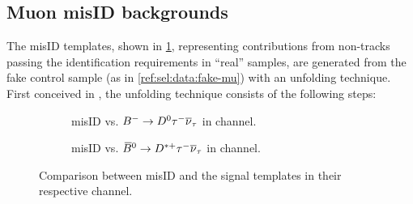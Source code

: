 \subsection{Muon misID backgrounds}
\label{ref:fit:tmpl:misid}

The \muon misID templates,
shown in \cref{fig:misid-vs-sig},
representing contributions from non-\muon tracks passing the \muon
identification requirements in ``real'' \muon samples,
are generated from the fake \muon control sample
(as in \cref{ref:sel:data:fake-mu}) with an unfolding technique.
First conceived in \cite{LHCb-ANA-2016-059}, the unfolding technique
consists of the following steps:

\begin{figure}[htb]
    \centering
    \begin{subfigure}{0.9\textwidth}
        \centering
        \caption{
            \muon misID vs. ${{{B}^-}} \rightarrow {\ensuremath{{D}^0}}{\ensuremath{\tau^-}}{\ensuremath{{\overline{\nu}}_\tau}}$ in \Dz channel.
        }
    \end{subfigure}

    \begin{subfigure}{0.9\textwidth}
        \centering
        \caption{
            \muon misID vs. ${{\kern 0.18em\overline{\kern -0.18em B}}{}^0} \rightarrow {\ensuremath{{D}^{*+}}}{\ensuremath{\tau^-}}{\ensuremath{{\overline{\nu}}_\tau}}$ in \Dstar channel.
        }
    \end{subfigure}

    \caption{
        Comparison between misID and the signal templates in their
        respective channel.
    }
    \label{fig:misid-vs-sig}
\end{figure}

